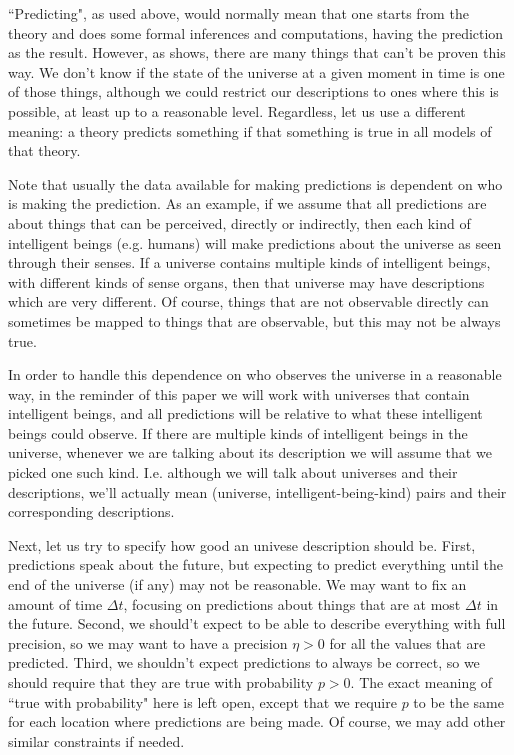 \documentclass[a4paper
,draft
]{article}
\newcommand{\ghilimele}[1]{``#1"}
\begin{document}
\ghilimele{Predicting}, as used above, would normally mean that one
starts from the theory and does some formal inferences and computations, having
the prediction as the result.
However, as \cite{Calude2013} shows, there are many
things that can't be proven this way.
We don't know if the state of the universe at a given moment in time is one of
those things, although we could restrict our descriptions to ones where this
is possible, at least up to a reasonable level.
Regardless, let us use a different meaning: a theory predicts something if
that something is true in all models of that theory.

Note that usually the data available for making predictions is dependent
on who is making the prediction. As an example, if we assume that
all predictions are about things that can be perceived, directly or indirectly,
then
each kind of intelligent beings (e.g. humans) will make predictions
about the universe as seen through their senses. If a universe contains
multiple kinds of intelligent beings, with different kinds of
sense organs, then that universe may have descriptions which are
very different.
Of course, things that are not observable directly can sometimes be mapped
to things that are observable, but this may not be always true.

In order to handle this dependence on who observes the universe
in a reasonable way, in the reminder of this paper we will work with universes
that contain intelligent beings,
and all predictions will be relative to what these intelligent beings
could observe.
If there are multiple kinds of intelligent beings in the
universe, whenever we are talking about its description
we will assume that we picked one such kind.
I.e. although we
will talk about universes and their descriptions, we'll actually mean
(universe, intelligent-being-kind) pairs and their corresponding descriptions.

Next, let us try to specify how good an univese description
should be. First, predictions speak about the future, but expecting to
predict everything until the end of the universe (if any) may not be
reasonable. We may want to fix an amount of time $\Delta t$,
focusing on predictions about things that are at most
$\Delta t$ in the future. Second, we should't expect to
be able to describe everything with full precision, so we may want to
have a precision $\eta>0$ for all the values that are predicted.
Third, we shouldn't expect predictions to always be correct, so
we should require that they are true with probability $p>0$.
The exact meaning of \ghilimele{true with probability} here is left open,
except that we require $p$ to be the same for each location where
predictions are being made.
Of course, we may add other similar constraints if needed.
\end{document}

